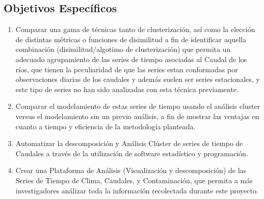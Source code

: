 \documentclass[10pt,a4paper]{article}
\begin{document}
\subsection{Objetivos Específicos}
\begin{enumerate}

\item Comparar una gama de técnicas tanto de clusterización, así como la elección de distintas métricas o funciones de disimilitud a fin de identificar aquella combinación (disimilitud/algotimo de clusterización) que permita un adecuado agrupamiento de las series de tiempo asociadas al Caudal de los ríos, que tienen la peculiaridad de que las series estan conformadas por observaciones diarias de los caudales y además suelen ser series estacionales, y este tipo de series no han sido analizadas con esta técnica previamente.

\item Comparar el modelamiento de estas series de tiempo usando el análisis cluster versus el modelamiento sin un previo análisis, a fin de mostrar las ventajas en cuanto a tiempo y eficiencia de la metodología planteada.

\item Automatizar la descomposición y Análisis Clúster de series de tiempo de Caudales a través de la utilización de software estadístico y programación.

\item Crear una Plataforma de Análisis (Visualización y descomposición) de las Series de Tiempo de Clima, Caudales, y Contaminación, que permita a más investigadores análizar toda la información recolectada durante este proyecto.

\end{enumerate}
\end{document}
